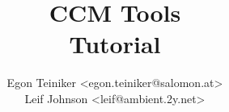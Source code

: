 \documentclass{report}
\title{{\Huge CCM Tools}\\Tutorial}
\author{Egon Teiniker <egon.teiniker@salomon.at>\\
Leif Johnson <leif@ambient.2y.net>}
\begin{document}
\maketitle
{}
\tableofcontents
\listoffigures

\newpage
{}
\setlength{\parskip}{1em}






%
%
%


\begin{appendix}



\end{appendix}



\end{document}
